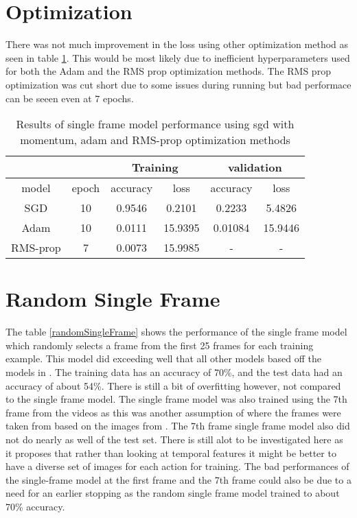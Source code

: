 \section{Optimization}
There was not much improvement in the loss using other optimization method as seen in table \ref{optim}.  This would be most likely due to inefficient hyperparameters used for both the Adam and the RMS prop optimization methods. The RMS prop optimization was cut short due to some issues during running but bad performace can be seeen even at 7 epochs.
\begin{table}[h!]
\centering
\begin{tabular}{ |c|c|c|c|c|c| } 
 \hline
  \multicolumn{2}{|c|}{ } &
 \multicolumn{2}{|c|}{Training } &
 \multicolumn{2}{|c|}{validation} \\
 \hline
 model & epoch & accuracy & loss & accuracy & loss \\ 
  \hline
 SGD & 10 &  0.9546 & 0.2101  & 0.2233 &5.4826 \\ 
 Adam & 10 &0.0111 & 15.9395 & 0.01084 &15.9446 \\
 RMS-prop & 7 & 0.0073 & 15.9985 & - & -  \\ 
 \hline
\end{tabular}
\caption{Results of single frame model performance using sgd with momentum, adam and RMS-prop optimization methods}
\label{optim}
\end{table}


\section{Random Single Frame}
The table \ref{randomSingleFrame} shows the performance of the single frame model which randomly selects a frame from the first 25 frames for each training example. This model did exceeding well that all other models based off the models in \citep{KarpathyCVPR14}.  The training data has an accuracy of 70\%, and the test data had an accuracy of about 54\%. There is still a bit of overfitting however, not compared to the single frame model. The single frame model was also trained using the 7th frame from the videos as this was another assumption of where the frames were taken from based on the images from \citep{KarpathyCVPR14}. The 7th frame single frame model also did not do nearly as well of the test set. There is still alot to be investigated here as it proposes that rather than looking at temporal features it might be better to have a diverse set of images for each action for training.  The bad performances of the single-frame model at the first frame and the 7th frame could also be due to a need for an earlier stopping as the random single frame model trained to about 70\% accuracy. 

